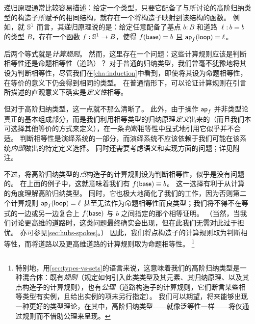 %
%
递归原理通常比较容易描述：给定一个类型，只要它配备了与所讨论的高阶归纳类型的构造子所赋予的相同结构，就存在一个将构造子映射到该结构的函数。
例如，就 $\mathbb{S}^1$ 而言，其递归原理说的是：给定任意配备了基点 $b:B$ 和道路 $\ell:b=b$ 的类型 $B$，存在一个函数 $f:\mathbb{S}^1\to B$，使得 $f(\mathsf{base})=b$ 且 $\mathsf{ap}_{f} (\mathsf{loop}) = \ell$。

%
%
后两个等式就是\emph{计算规则}。
%
%
然而，这里存在一个问题：这些计算规则应该是判断相等性还是命题相等性（道路）？
对于普通的归纳类型，我们曾毫不犹豫地将其设为判断相等性，尽管我们在\cref{cha:induction}中看到，即使将其设为命题相等性，在等价的意义下仍会得到相同的类型。
在普通情形下，可以论证计算规则在引言所描述的直观意义下确实是\emph{定义性}相等。

%
但对于高阶归纳类型，这一点就不那么清晰了。%
此外，由于操作 $\mathsf{ap}_{f}$ 并非类型论真正的基本组成部分，而是我们利用相等类型的归纳原理\emph{定义}出来的（而且我们本可选择其他等价的方式来定义），在一条\emph{判断}相等性中显式地引用它似乎并不合适。
判断相等性是演绎系统的一部分，而演绎系统不应该依赖于我们可能在该系统\emph{内部}做出的特定定义选择。
同时还需要考虑语义和实现方面的问题；详见附注。

不过，将高阶归纳类型的\emph{点}构造子的计算规则设为判断相等性，似乎是没有问题的。
在上面的例子中，这就意味着我们有 $f(\mathsf{base})\equiv b$。
这一选择有利于从计算的角度理解高阶归纳类型。
同时，它也极大地简化了我们的工作，因为否则第二个计算规则 $\mathsf{ap}_{f} (\mathsf{loop}) = \ell$ 甚至无法作为命题相等性而良类型；我们将不得不在等式的一边或另一边复合上 $f(\mathsf{base})$ 与 $b$ 之间指定的那个相等证明。
（当然，当我们讨论更高维的道路时，这类问题最终确实会出现，但在此我们无需对此过于担忧。
亦可参见\cref{sec:hubs-spokes}。）
因此，我们将点构造子的计算规则取为判断相等性，而将道路以及更高维道路的计算规则取为命题相等性。%
\footnote{特别地，用\cref{sec:types-vs-sets}的语言来说，这意味着我们的高阶归纳类型是一种混合体：既有\emph{规则}（规定如何引入此类类型及其元素、其归纳原理、以及其点构造子的计算规则），也有\emph{公理}（道路构造子的计算规则，它们断言某些相等类型有实例，且给出实例的项未另行指定）。
我们可以期望，将来能够出现一种更好的类型理论，在其中，高阶归纳类型——就像泛等性一样——将仅通过规则而不借助公理来呈现。%
%
%
}

